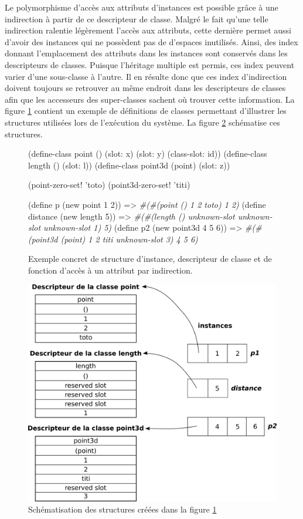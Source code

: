 \documentclass[12pt,twoside,letterpaper,francais]{book}
\newcommand{\schemeresult}[1]{{\it #1}}
\begin{document}
Le polymorphisme d'accès aux attributs d'instances est possible grâce
à une indirection à partir de ce descripteur de classe. Malgré le fait
qu'une telle indirection ralentie légèrement l'accès aux attributs,
cette dernière permet aussi d'avoir des instances qui ne possèdent pas
de d'espaces inutilisés. Ainsi, des index donnant l'emplacement des
attributs dans les instances sont conservés dans les descripteurs de
classes. Puisque l'héritage multiple est permis, ces index peuvent
varier d'une sous-classe à l'autre. Il en résulte donc que ces index
d'indirection doivent toujours se retrouver au même endroit dans les
descripteurs de classes afin que les accesseurs des super-classes
sachent où trouver cette information. La figure \ref{OO:obj-struct}
contient un exemple de définitions de classes permettant d'illustrer
les structures utilisées lors de l'exécution du système. La figure
\ref{OO:classdesc} schématise ces structures.

\begin{figure}[htb!]
  \begin{schemecode}
(define-class point () (slot: x) (slot: y) (class-slot: id))
(define-class length () (slot: l))
(define-class point3d (point) (slot: z))

(point-zero-set! 'toto)
(point3d-zero-set! 'titi)

(define p (new point 1 2))
   => \schemeresult{\#(\#(point () 1 2 toto) 1 2)}
(define distance (new length 5)) 
   => \schemeresult{\#(\#(length () unknown-slot unknown-slot unknown-slot 1) 5)}
(define p2 (new point3d 4 5 6))  
   => \schemeresult{\#(\#(point3d (point) 1 2 titi unknown-slot 3) 4 5 6)}
  \end{schemecode}
  \caption{Exemple concret de structure d'instance, descripteur de
    classe et de fonction d'accès à un attribut par indirection.}
  \label{OO:obj-struct}
\end{figure}


\begin{figure}[htb!]
  \center
  \includegraphics[scale=0.7]{oo-schema}
  \caption{Schématisation des structures créées dans la figure
    \ref{OO:obj-struct}}
  \label{OO:classdesc}
\end{figure}
\end{document}
